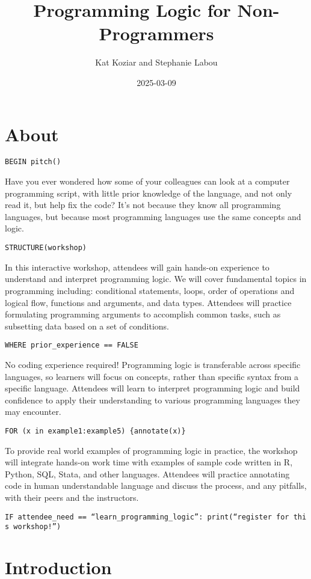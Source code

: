 \documentclass[
]{book}
\title{Programming Logic for Non-Programmers}
\author{Kat Koziar and Stephanie Labou}
\date{2025-03-09}
\begin{document}
\maketitle

{
\setcounter{tocdepth}{1}
\tableofcontents
}
\chapter{About}\label{about}

\texttt{BEGIN\ pitch()}

Have you ever wondered how some of your colleagues can look at a computer programming script, with little prior knowledge of the language, and not only read it, but help fix the code? It's not because they know all programming languages, but because most programming languages use the same concepts and logic.

\texttt{STRUCTURE(workshop)}

In this interactive workshop, attendees will gain hands-on experience to understand and interpret programming logic. We will cover fundamental topics in programming including: conditional statements, loops, order of operations and logical flow, functions and arguments, and data types. Attendees will practice formulating programming arguments to accomplish common tasks, such as subsetting data based on a set of conditions.

\texttt{WHERE\ prior\_experience\ ==\ FALSE}

No coding experience required! Programming logic is transferable across specific languages, so learners will focus on concepts, rather than specific syntax from a specific language. Attendees will learn to interpret programming logic and build confidence to apply their understanding to various programming languages they may encounter.

\texttt{FOR\ (x\ in\ example1:example5)\ \{annotate(x)\}}

To provide real world examples of programming logic in practice, the workshop will integrate hands-on work time with examples of sample code written in R, Python, SQL, Stata, and other languages. Attendees will practice annotating code in human understandable language and discuss the process, and any pitfalls, with their peers and the instructors.

\texttt{IF\ attendee\_need\ ==\ “learn\_programming\_logic”:\ print(“register\ for\ this\ workshop!”)}

\chapter{Introduction}\label{intro}
\end{document}
